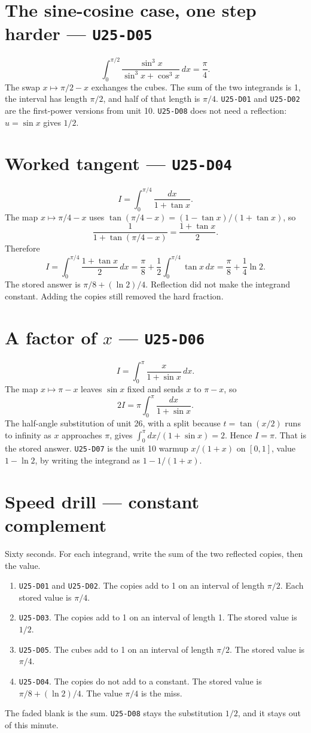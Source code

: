 \section{The sine-cosine case, one step harder --- \texttt{U25-D05}}
\[
\int_0^{\pi/2}\frac{\sin^3 x}{\sin^3 x+\cos^3 x}\,dx=\frac\pi4.
\]
The swap $x\mapsto\pi/2-x$ exchanges the cubes. The sum of the two integrands is 1, the interval has length $\pi/2$, and half of that length is $\pi/4$. \texttt{U25-D01} and \texttt{U25-D02} are the first-power versions from unit 10. \texttt{U25-D08} does not need a reflection: $u=\sin x$ gives $1/2$.

\section{Worked tangent --- \texttt{U25-D04}}
\[
I=\int_0^{\pi/4}\frac{dx}{1+\tan x}.
\]
The map $x\mapsto\pi/4-x$ uses $\tan(\pi/4-x)=(1-\tan x)/(1+\tan x)$, so
\[
\frac{1}{1+\tan(\pi/4-x)}=\frac{1+\tan x}{2}.
\]
Therefore
\[
I=\int_0^{\pi/4}\frac{1+\tan x}{2}\,dx=\frac\pi8+\frac12\int_0^{\pi/4}\tan x\,dx=\frac\pi8+\frac14\ln 2.
\]
The stored answer is $\pi/8+(\ln 2)/4$. Reflection did not make the integrand constant. Adding the copies still removed the hard fraction.

\section{A factor of $x$ --- \texttt{U25-D06}}
\[
I=\int_0^{\pi}\frac{x}{1+\sin x}\,dx.
\]
The map $x\mapsto\pi-x$ leaves $\sin x$ fixed and sends $x$ to $\pi-x$, so
\[
2I=\pi\int_0^{\pi}\frac{dx}{1+\sin x}.
\]
The half-angle substitution of unit 26, with a split because $t=\tan(x/2)$ runs to infinity as $x$ approaches $\pi$, gives $\int_0^{\pi} dx/(1+\sin x)=2$. Hence $I=\pi$. That is the stored answer. \texttt{U25-D07} is the unit 10 warmup $x/(1+x)$ on $[0,1]$, value $1-\ln 2$, by writing the integrand as $1-1/(1+x)$.

\section{Speed drill --- constant complement}
Sixty seconds. For each integrand, write the sum of the two reflected copies, then the value.
\begin{enumerate}
  \item \texttt{U25-D01} and \texttt{U25-D02}. The copies add to 1 on an interval of length $\pi/2$. Each stored value is $\pi/4$.
  \item \texttt{U25-D03}. The copies add to 1 on an interval of length 1. The stored value is $1/2$.
  \item \texttt{U25-D05}. The cubes add to 1 on an interval of length $\pi/2$. The stored value is $\pi/4$.
  \item \texttt{U25-D04}. The copies do not add to a constant. The stored value is $\pi/8+(\ln 2)/4$. The value $\pi/4$ is the miss.
\end{enumerate}
The faded blank is the sum. \texttt{U25-D08} stays the substitution $1/2$, and it stays out of this minute.

